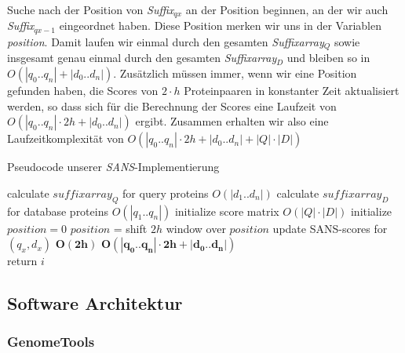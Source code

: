 \documentclass{article}
\begin{document}
Suche nach der Position von \emph{Suffix$_{qx}$} an der Position beginnen, an
der wir auch \emph{Suffix$_{qx-1}$} eingeordnet haben. Diese Position merken wir
uns in der Variablen \emph{position}. Damit laufen wir einmal durch den gesamten
\emph{Suffixarray$_Q$} sowie insgesamt genau einmal durch den gesamten
\emph{Suffixarray$_D$} und bleiben so in $O(|q_0..q_n| + |d_0..d_n|)$.
Zusätzlich müssen immer, wenn wir eine Position gefunden haben, die Scores von $2
\cdot h$ Proteinpaaren in konstanter Zeit aktualisiert werden, so dass sich für
die Berechnung der Scores eine Laufzeit von ${O(|q_0..q_n|\cdot2h +
|d_0..d_n|)}$ ergibt. Zusammen erhalten wir also eine Laufzeitkomplexität von ${O(|q_0..q_n|\cdot2h + |d_0..d_n|+|Q|\cdot|D|)}$


\begin{algorithm}
  \caption{Pseudocode unserer \emph{SANS}-Implementierung}
 \begin{algorithmic}
     \State calculate $suffixarray_Q$ for query proteins \Comment $O(|d_1..d_n|)$
     \State calculate $suffixarray_D$ for database proteins \Comment $O(|q_1..q_n|)$
     \State initialize score matrix \Comment $O(|Q|\cdot|D|)$
     \State initialize $position = 0$
       \State  $position$ =  
       \State shift $2h$ window over $position$ 
         \State update SANS-scores for  $(q_x,d_x)$
       \EndFor \Comment $\mathbf{O(2h)}$
     \EndFor \Comment $\mathbf{O(|q_0..q_n|\cdot2h + |d_0..d_n|)}$
    \EndFunction  
       \\
    
          \State return $i$ 
        \EndIf
      \EndFor 
    \EndFunction
  \end{algorithmic}
\end{algorithm}

\subsection{Software Architektur}

\subsubsection{GenomeTools}
\end{document}
